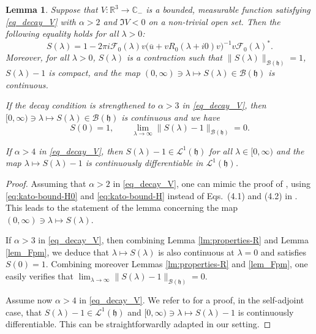 \documentclass{article}
\def\B{\mathscr B}
\def\C{\mathbb C}
\def\F{\mathscr F}
\def\L{\mathcal L}
\def\R{\mathbb R}
\def\HS{\mathfrak h}
\newtheorem{Lemma}[Theorem]{Lemma}
\begin{document}
\begin{Lemma}\label{lm:S(lambda)}
Suppose that $V:\R^3\to \C_-$ is a bounded, measurable function satisfying \eqref{eq_decay_V} with $\alpha>2$ and $\Im V<0$ on a non-trivial open set. Then the following equality holds for all $\lambda>0$:
\begin{equation}\label{eq_S_stationary}
S(\lambda)= 1-2\pi i \F_0(\lambda) v \big(\overline{u} +v R_0(\lambda+i0)v\big)^{-1}v \F_0(\lambda)^*.
\end{equation}
Moreover, for all $\lambda>0$, $S(\lambda)$ is a contraction such that $\|S(\lambda)\|_{\B(\HS)}=1$, $S(\lambda)-1$ is compact, and the map $(0,\infty)\ni\lambda\mapsto S(\lambda)\in\B(\HS)$ is continuous.

If the decay condition is strengthened to $\alpha >3$ in \eqref{eq_decay_V}, then $[0,\infty)\ni\lambda\mapsto S(\lambda)\in\B(\HS)$ is continuous and we have
\begin{equation*}
S(0)=1,\qquad \lim_{\lambda\to\infty}\|S(\lambda)-1\|_{\B(\HS)}=0.
\end{equation*}

If $\alpha>4$ in \eqref{eq_decay_V}, then 
$S(\lambda)-1 \in \L^1(\HS)$ for all $\lambda \in [0,\infty)$ and the map $\lambda \mapsto S(\lambda)-1$ is continuously differentiable in $\L^1(\HS)$.
\end{Lemma}

\begin{proof}
Assuming that $\alpha >2$ in \eqref{eq_decay_V}, one can mimic the proof of \cite[Thm.~2.6]{FN}, using \eqref{eq:kato-bound-H0} and \eqref{eq:kato-bound-H} instead of Eqs.~(4.1) and (4.2) in \cite{FN}. This leads to the statement of the lemma concerning the map $(0,\infty)\ni \lambda \mapsto S(\lambda)$.

If $\alpha>3$ in \eqref{eq_decay_V}, then combining Lemma \ref{lm:properties-R} and Lemma \ref{lem_Fpm}, we deduce that $\lambda\mapsto S(\lambda)$ 
is also continuous at $\lambda=0$ and satisfies $S(0)=1$. 
Combining moreover Lemmas \ref{lm:properties-R} and \ref{lem_Fpm}, one easily verifies that $\lim_{\lambda\to\infty}\|S(\lambda)-1\|_{\B(\HS)}=0$. 

Assume now $\alpha>4$ in \eqref{eq_decay_V}.
We refer to \cite[Prop.~8.1.9]{Yaf10} for a proof, in the self-adjoint
case, that $S(\lambda)-1\in \L^1(\HS)$ and $[0,\infty)\ni\lambda\mapsto S(\lambda)-1$ is continuously differentiable. 
This can be straightforwardly adapted in our setting.
\end{proof}
\end{document}
